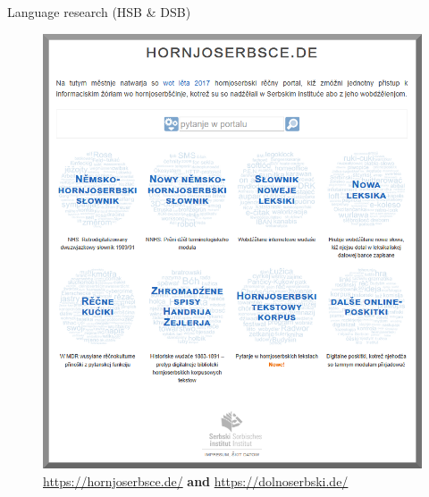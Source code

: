   \begin{block}{Language research (HSB \& DSB)}  


    \begin{figure}
        \centering
        \includegraphics[width=0.7\colwidth]{04_z_01_hornjoserbsce_gross_rand.png}
        \caption{\url{https://hornjoserbsce.de/} \textbf{and} \url{https://dolnoserbski.de/}}
        \label{fig:hornjoserbsce}
    \end{figure}


  \end{block}
